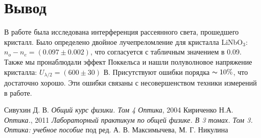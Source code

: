 \documentclass[12pt,a4paper]{article}
\begin{document}
	
	\vspace{15mm}
	\section*{Вывод}
	В работе была исследована интерференция рассеянного света, прошедшего кристалл. Было определено двойное лучепреломление для кристалла LiNbO$_3$: $n_o - n_e = (0.097 \pm 0.002)$, что согласуется с табличным значением в 0.09. Также мы пронаблюдали эффект Поккельса и нашли полуволновое напряжение кристалла: $U_{\lambda / 2} = (600 \pm 30)$ В. Присутствуют ошибки порядка $\thicksim 10\%$, что достаточно хорошо. Эти ошибки связаны с несовершенством техники измерений в работе.


\newpage
\begin{thebibliography}{9}
	 Сивухин Д. В. \emph{Общий курс физики. Том 4 Оптика}, 2004
	 Кириченко Н.А. \emph{Оптика.}, 2011
	 \emph{Лабораторный практикум по общей физике. В 3 томах. Том 3. Оптика: учебное пособие} под ред. А. В. Максимычева, М. Г. Никулина
\end{thebibliography}
\end{document}
